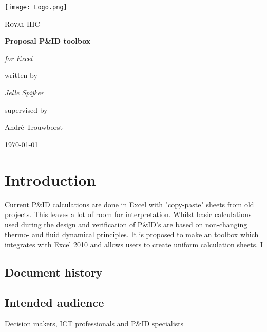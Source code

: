 \documentclass[11pt,fleqn,,a4paper,twoside,openright]{book}
\begin{document}
	
	\begin{titlepage}
		\centering
		\texttt{[image: Logo.png]}\par\vspace{1cm}
		{\scshape\LARGE Royal IHC \par}
		\vspace{1cm}
		{\huge\bfseries Proposal P\&ID toolbox\par}
		\vspace{0.7cm}
		{\LARGE\itshape for Excel\par}
		\vspace{2cm}
		written by\par
		{\Large\itshape Jelle Spijker\par}
		\vfill
		supervised by\par
		Andr\'{e} Trouwborst
		
		\vfill
		
		{\large \today\par}
	\end{titlepage}
	
	\hspace{2cm}
	\tableofcontents
	
	\chapter{Introduction}\label{chap:Introduction}
	Current P\&ID calculations are done in Excel with "copy-paste" sheets from old projects. This leaves a lot of room for interpretation. Whilst basic calculations used during the design and verification of P\&ID's are based on non-changing thermo- and fluid dynamical principles. It is proposed to  make an toolbox which integrates with Excel 2010 and allows users to create uniform calculation sheets. I
	
	\section{Document history}
	\begin{versionhistory}
	\end{versionhistory}
	
	\section{Intended audience}\label{sec:Intended audience}
	Decision makers, ICT professionals and P\&ID specialists
	
\end{document}
